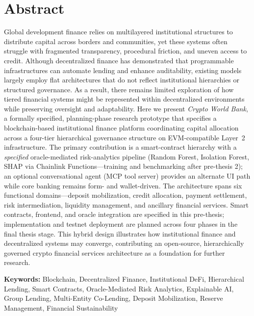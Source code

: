 \documentclass[12pt, a4paper]{report}
\begin{document}
\chapter*{Abstract}
{}

Global development finance relies on multilayered institutional structures to distribute capital across borders and communities, yet these systems often struggle with fragmented transparency, procedural friction, and uneven access to credit. Although decentralized finance has demonstrated that programmable infrastructures can automate lending and enhance auditability, existing models largely employ flat architectures that do not reflect institutional hierarchies or structured governance. As a result, there remains limited exploration of how tiered financial systems might be represented within decentralized environments while preserving oversight and adaptability. Here we present \textit{Crypto World Bank}, a formally specified, planning-phase research prototype that specifies a blockchain-based institutional finance platform coordinating capital allocation across a four-tier hierarchical governance structure on EVM-compatible Layer~2 infrastructure. The primary contribution is a smart-contract hierarchy with a \textit{specified} oracle-mediated risk-analytics pipeline (Random Forest, Isolation Forest, SHAP via Chainlink Functions---training and benchmarking after pre-thesis 2); an optional conversational agent (MCP tool server) provides an alternate UI path while core banking remains form- and wallet-driven. The architecture spans six functional domains---deposit mobilization, credit allocation, payment settlement, risk intermediation, liquidity management, and ancillary financial services. Smart contracts, frontend, and oracle integration are specified in this pre-thesis; implementation and testnet deployment are planned across four phases in the final thesis stage. This hybrid design illustrates how institutional finance and decentralized systems may converge, contributing an open-source, hierarchically governed crypto financial services architecture as a foundation for further research.

\vspace{0.5em}
\noindent\textbf{Keywords:} Blockchain, Decentralized Finance, Institutional DeFi, Hierarchical Lending, Smart Contracts, Oracle-Mediated Risk Analytics, Explainable AI, Group Lending, Multi-Entity Co-Lending, Deposit Mobilization, Reserve Management, Financial Sustainability
\end{document}

